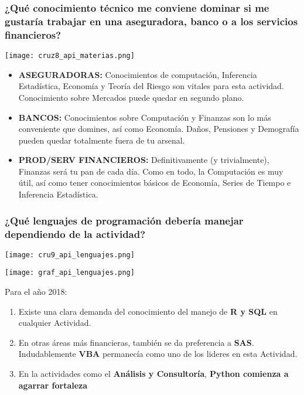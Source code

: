 \documentclass{article}
\begin{document}
\subsubsection{¿Qué conocimiento técnico me conviene dominar si me gustaría trabajar en una aseguradora, banco o a los servicios financieros?}

\begin{center}
    \texttt{[image: cruz8\_api\_materias.png]}
\end{center}


\begin{itemize}
    \item \textbf{ASEGURADORAS:} Conocimientos de computación, Inferencia Estadística, Economía y Teoría del Riesgo son vitales para esta actividad. Conocimiento sobre Mercados puede quedar en segundo plano. 
    
    \item \textbf{BANCOS:} Conocimientos sobre Computación y Finanzas son lo más conveniente que domines, así como Economía. Daños, Pensiones y Demografía pueden quedar totalmente fuera de tu arsenal. 
    
    \item \textbf{PROD/SERV FINANCIEROS:} Definitivamente (y trivialmente), Finanzas será tu pan de cada día. Como en todo, la Computación es muy útil, así como tener conocimientos básicos de Economía, Series de Tiempo e Inferencia Estadística. 
\end{itemize}


\subsubsection{¿Qué lenguajes de programación debería manejar dependiendo de la actividad?}

\begin{center}
    \texttt{[image: cru9\_api\_lenguajes.png]}
\end{center}

\begin{center}
    \texttt{[image: graf\_api\_lenguajes.png]}
\end{center}


Para el año 2018: 

\begin{enumerate}
    \item Existe una clara demanda del conocimiento del manejo de \textbf{R y SQL} en cualquier Actividad. 
    
    \item En otras áreas más financieras, también se da preferencia a \textbf{SAS}. Indudablemente \textbf{VBA} permanecía como uno de los lideres en esta Actividad.
    
    \item En la actividades como el \textbf{Análisis y Consultoría}, \textbf{Python comienza a agarrar fortaleza}

\end{enumerate}
\end{document}
